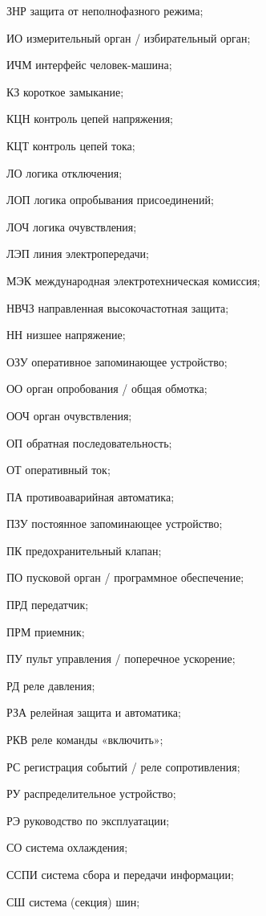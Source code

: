 \begin{list}{}
\item[ЗНР] защита от неполнофазного режима;
\item[ИО] измерительный орган / избирательный орган;
\item[ИЧМ] интерфейс человек-машина;
\item[КЗ] короткое замыкание;
\item[КЦН] контроль цепей напряжения;
\item[КЦТ] контроль цепей тока;
\item[ЛО] логика отключения;
\item[ЛОП] логика опробывания присоединений;
\item[ЛОЧ] логика очувствления;
\item[ЛЭП] линия электропередачи;
\item[МЭК] международная электротехническая комиссия;
\item[НВЧЗ] направленная высокочастотная защита;
\item[НН] низшее напряжение;
\item[ОЗУ] оперативное запоминающее устройство;
\item[ОО] орган опробования / общая обмотка;
\item[ООЧ] орган очувствления;
\item[ОП] обратная последовательность;
\item[ОТ] оперативный ток;
\item[ПА] противоаварийная автоматика;
\item[ПЗУ] постоянное запоминающее устройство;
\item[ПК] предохранительный клапан;
\item[ПО] пусковой орган / программное обеспечение;
\item[ПРД] передатчик;
\item[ПРМ] приемник;
\item[ПУ] пульт управления / поперечное ускорение;
\item[РД] реле давления;
\item[РЗА] релейная защита и автоматика;
\item[РКВ] реле команды «включить»;
\item[РС] регистрация событий / реле сопротивления;
\item[РУ] распределительное устройство;
\item[РЭ] руководство по эксплуатации;
\item[СО] система охлаждения;
\item[ССПИ] система сбора и передачи информации;
\item[СШ] система (секция) шин;

\end{list}
